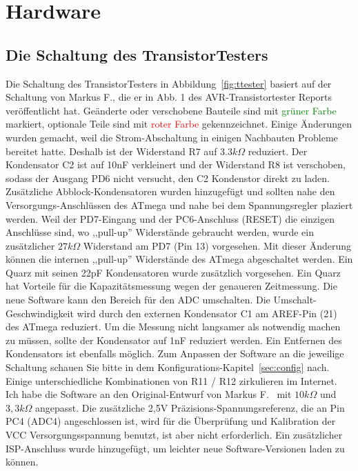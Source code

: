 \chapter{Hardware}

\section{Die Schaltung des TransistorTesters}
\label{sec:hardware}
Die Schaltung des TransistorTesters in Abbildung~\ref{fig:ttester} basiert auf der Schaltung von
Markus F., die er in Abb. 1 des AVR-Transistortester Reports \cite{Frejek} ver\"offentlicht hat.
Ge\"anderte oder verschobene Bauteile sind mit \textcolor{green}{gr\"uner Farbe} markiert, optionale Teile sind
mit \textcolor{red}{roter Farbe} gekennzeichnet.
Einige \"Anderungen wurden gemacht, weil die Strom-Abschaltung in einigen Nachbauten Probleme
bereitet hatte.
Deshalb ist der Widerstand R7 auf \(3.3k\Omega\) reduziert. 
Der Kondensator C2 ist auf 10nF verkleinert und der Widerstand R8 ist verschoben, sodass der
Ausgang PD6 nicht versucht, den C2 Kondenstor direkt zu laden.
Zus\"atzliche Abblock-Kondensatoren wurden hinzugef\"ugt und sollten nahe den Versorgungs-Anschl\"ussen
des ATmega und nahe bei dem Spannungsregler plaziert werden.
Weil der PD7-Eingang und der PC6-Anschluss (RESET) die einzigen Anschl\"usse sind, wo
,,pull-up'' Widerst\"ande gebraucht werden, wurde ein zus\"atzlicher \(27k\Omega\) Widerstand am PD7 (Pin 13) vorgesehen.
Mit dieser \"Anderung k\"onnen die internen ,,pull-up'' Widerst\"ande des ATmega abgeschaltet werden.
Ein Quarz mit seinen 22pF Kondensatoren wurde zus\"atzlich vorgesehen.
Ein Quarz hat Vorteile f\"ur die Kapazit\"atsmessung wegen der genaueren Zeitmessung.
Die neue Software kann den Bereich f\"ur den ADC umschalten. Die Umschalt-Geschwindigkeit
wird durch den externen Kondensator C1 am AREF-Pin (21) des ATmega reduziert.
Um die Messung nicht langsamer als notwendig machen zu m\"ussen, sollte der Kondensator auf
1nF reduziert werden. Ein Entfernen des Kondensators ist ebenfalls m\"oglich.
Zum Anpassen der Software an die jeweilige Schaltung schauen Sie bitte in dem
Konfigurations-Kapitel~\ref{sec:config} nach. 
Einige unterschiedliche Kombinationen von R11 / R12 zirkulieren im Internet.
Ich habe die Software an den Original-Entwurf von Markus F.~\cite{Frejek} mit \(10k\Omega\) und \(3,3k\Omega\) angepasst.
Die zus\"atzliche 2,5V Pr\"azisions-Spannungsreferenz, die an Pin PC4 (ADC4) angeschlossen ist,
wird f\"ur die \"Uberpr\"ufung und Kalibration der VCC Versorgungsspannung benutzt, ist aber nicht
erforderlich.
Ein zus\"atzlicher ISP-Anschluss wurde hinzugef\"ugt, um leichter neue Software-Versionen
laden zu k\"onnen.

